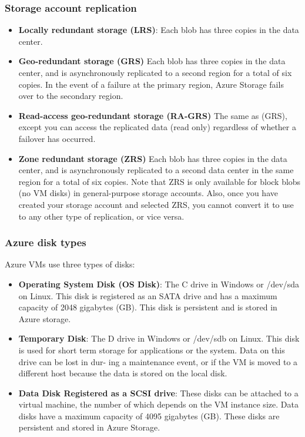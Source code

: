 \documentclass[12pt]{article}
\begin{document}
\subsubsection{Storage account replication}
\begin{itemize}
    \item \textbf{Locally redundant storage (LRS)}: Each blob has three copies in the data center.
    \item \textbf{Geo-redundant storage (GRS)} Each blob has three copies in the data center, and is asynchronously replicated to a second region for a total of six copies. In the event of a failure at the primary region, Azure Storage fails over to the secondary region.
    \item \textbf{Read-access geo-redundant storage (RA-GRS)} The same as (GRS), except you can access the replicated data (read only) regardless of whether a failover has occurred.
    \item \textbf{Zone redundant storage (ZRS)} Each blob has three copies in the data center, and is asynchronously replicated to a second data center in the same region for a total of six copies. Note that ZRS is only available for block blobs (no VM disks) in general-purpose storage accounts. Also, once you have created your storage account and selected ZRS, you cannot convert it to use to any other type of replication, or vice versa.
\end{itemize}

\subsubsection{Azure disk types}
Azure VMs use three types of disks:
\begin{itemize}
    \item \textbf{Operating System Disk (OS Disk)}: The C drive in Windows or /dev/sda on Linux. This disk is registered as an SATA drive and has a maximum capacity of 2048 gigabytes (GB). This disk is persistent and is stored in Azure storage.
    \item \textbf{Temporary Disk}: The D drive in Windows or /dev/sdb on Linux. This disk is used for short term storage for applications or the system. Data on this drive can be lost in dur- ing a maintenance event, or if the VM is moved to a different host because the data is stored on the local disk.
    \item \textbf{Data Disk Registered as a SCSI drive}: These disks can be attached to a virtual machine, the number of which depends on the VM instance size. Data disks have a maximum capacity of 4095 gigabytes (GB). These disks are persistent and stored in Azure Storage.
\end{itemize}
\end{document}

